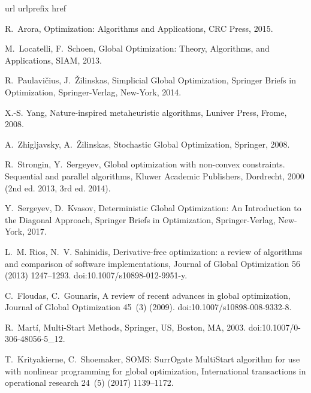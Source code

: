 \documentclass[review]{elsarticle}
\begin{document}
\begin{thebibliography}{10}
\expandafter\ifx\csname url\endcsname\relax
  \def\url#1{\texttt{#1}}\fi
\expandafter\ifx\csname urlprefix\endcsname\relax\def\urlprefix{URL }\fi
\expandafter\ifx\csname href\endcsname\relax
  \def\href#1#2{#2} \def\path#1{#1}\fi

R.~Arora, Optimization: Algorithms and Applications, CRC Press, 2015.

M.~Locatelli, F.~Schoen, Global Optimization: Theory, Algorithms, and
  Applications, SIAM, 2013.

R.~Paulavi{\v c}ius, J.~{\v Z}ilinskas, Simplicial Global Optimization,
  Springer Briefs in Optimization, Springer-Verlag, New-York, 2014.

X.-S. Yang, Nature-inspired metaheuristic algorithms, Luniver Press, Frome,
  2008.

A.~Zhigljavsky, A.~{\v Z}ilinskas, Stochastic Global Optimization, Springer,
  2008.

R.~Strongin, Y.~Sergeyev, Global optimization with non-convex constraints.
  Sequential and parallel algorithms, Kluwer Academic Publishers, Dordrecht,
  2000 (2nd ed. 2013, 3rd ed. 2014).

Y.~Sergeyev, D.~Kvasov, Deterministic Global Optimization: An Introduction to
  the Diagonal Approach, Springer Briefs in Optimization, Springer-Verlag,
  New-York, 2017.

L.~M. Rios, N.~V. Sahinidis, Derivative-free optimization: a review of
  algorithms and comparison of software implementations, Journal of Global
  Optimization 56 (2013) 1247--1293.
\newblock \href {https://doi.org/10.1007/s10898-012-9951-y}
  {\path{doi:10.1007/s10898-012-9951-y}}.

C.~Floudas, C.~Gounaris, A review of recent advances in global optimization,
  Journal of Global Optimization 45~(3) (2009).
\newblock \href {https://doi.org/10.1007/s10898-008-9332-8}
  {\path{doi:10.1007/s10898-008-9332-8}}.

R.~Mart{\'i}, Multi-Start Methods, Springer, US, Boston, MA, 2003.
\newblock \href {https://doi.org/10.1007/0-306-48056-5_12}
  {\path{doi:10.1007/0-306-48056-5_12}}.

T.~Krityakierne, C.~Shoemaker, {SOMS}: {SurrOgate} {MultiStart} algorithm for
  use with nonlinear programming for global optimization, International
  transactions in operational research 24~(5) (2017) 1139--1172.


\end{thebibliography}
\end{document}
